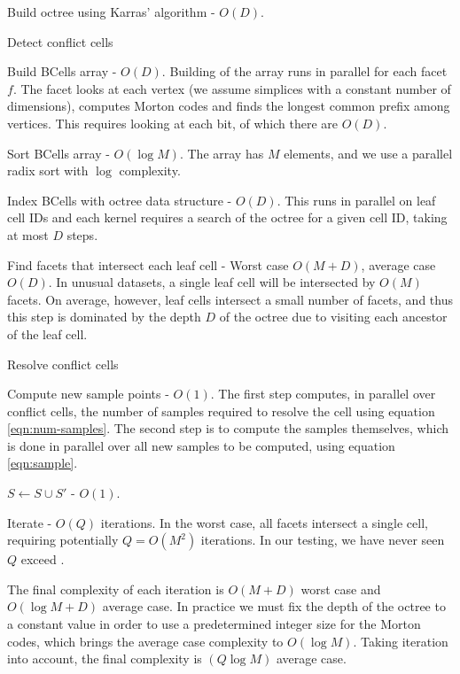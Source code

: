 \documentclass[submission]{gmp2017}
\begin{document}
\begin{tightenumerate}
\item Build octree using Karras' algorithm \cite{karras2012maximizing} - $O(D)$.
\item Detect conflict cells
  \begin{tightenumerate}
  \item Build BCells array - $O(D)$. Building of the array runs in parallel for each facet $f$. The facet looks at each vertex (we assume simplices with a constant number of dimensions), computes Morton codes and finds the longest common prefix among vertices. This requires looking at each bit, of which there are $O(D)$.
  \item Sort BCells array - $O(\log{M})$. The array has $M$ elements, and we use a parallel radix sort with $\log$ complexity.
  \item Index BCells with octree data structure - $O(D)$. This runs in parallel on leaf cell IDs and each kernel requires a search of the octree for a given cell ID, taking at most $D$ steps.
  \item Find facets that intersect each leaf cell - Worst case $O(M+D)$, average case $O(D)$. In unusual datasets, a single leaf cell will be intersected by $O(M)$ facets. On average, however, leaf cells intersect a small number of facets, and thus this step is dominated by the depth $D$ of the octree due to visiting each ancestor of the leaf cell.
  \end{tightenumerate}
\item Resolve conflict cells
  \begin{tightenumerate}
  \item Compute new sample points - $O(1)$. The first step computes, in parallel over conflict cells, the number of samples required to resolve the cell using equation \eqref{eqn:num-samples}. The second step is to compute the samples themselves, which is done in parallel over all new samples to be computed, using equation \eqref{eqn:sample}.
  \item $S \leftarrow S \cup S'$ - $O(1)$.
  \end{tightenumerate}
\item Iterate - $O(Q)$ iterations. In the worst case, all facets intersect a single cell, requiring potentially $Q=O(M^2)$ iterations. In our testing, we have never seen $Q$ exceed .
\end{tightenumerate}

The final complexity of each iteration is $O(M+D)$ worst case and $O(\log{M}+D)$ average case. In practice we must fix the depth of the octree to a constant value in order to use a predetermined integer size for the Morton codes, which brings the average case complexity to $O(\log{M})$. Taking iteration into account, the final complexity is $(Q\log{M})$ average case.
\end{document}
